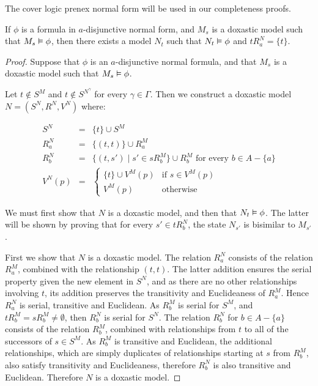 The cover logic prenex normal form will be used in our completeness proofs.

\begin{lemma}\label{kd45-successors}
If $\phi$ is a formula in $a$-disjunctive normal form, and $M_s$ is a doxastic
model such that $M_s \vDash \phi$, then there exists a model $N_t$ such that
$N_t \vDash \phi$ and $tR^N_a = \{t\}$.
\end{lemma}

\begin{proof}
Suppose that $\phi$ is an $a$-disjunctive normal formula, and that $M_s$ is a
doxastic model such that $M_s \vDash \phi$. 

Let $t \notin S^M$ and $t \notin S^{N^\gamma}$ for every $\gamma \in \Gamma$.
Then we construct a doxastic model $N = (S^N, R^N, V^N)$ where:

\begin{eqnarray*}
S^N &=& \{t\} \cup S^M\\
R^N_a &=& \{(t, t)\} \cup R^M_a\\
R^N_b &=& \{(t, s') \mid s' \in sR^M_b\} \cup R^M_b \text{ for every $b \in A -
\{a\}$}\\
V^N(p) &=& \begin{cases}
\{t\} \cup V^M(p) & \text{if $s \in V^M(p)$}\\
V^M(p) & \text{otherwise}
\end{cases}
\end{eqnarray*}

We must first show that $N$ is a doxastic model, and then that $N_t \vDash
\phi$. The latter will be shown by proving that for every $s' \in tR^N_b$, the
state $N_{s'}$ is bisimilar to $M_{s'}$.

First we show that $N$ is a doxastic model. The relation $R^N_a$ consists of the
relation $R^M_a$, combined with the relationship $(t,t)$. The latter addition
ensures the serial property given the new element in $S^N$, and as there are no
other relationships involving $t$, its addition preserves the transitivity and
Euclideaness of $R^M_a$. Hence $R^N_a$ is serial, transitive and Euclidean.
As $R^M_b$ is serial for $S^M$, and $tR^M_b = sR^M_b \ne \emptyset$, then
$R^N_b$ is serial for $S^N$. The relation $R^N_b$ for $b \in A - \{a\}$ consists
of the relation $R^M_b$, combined with relationships from $t$ to all of the
successors of $s \in S^M$. As $R^M_b$ is transitive and Euclidean, the
additional relationships, which are simply duplicates of relationships starting
at $s$ from $R^M_b$, also satisfy transitivity and Euclideaness, therefore
$R^N_b$ is also transitive and Euclidean. Therefore $N$ is a doxastic model.


\end{proof}
